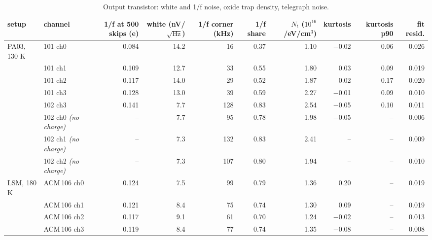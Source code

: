 \begin{table}[H]\centering\small
\caption{Output transistor: white and 1/f noise, oxide trap density, telegraph noise.}\label{tab:tr}
\begin{adjustbox}{max width=\linewidth}
\begin{tabular}{llrrrrrrrr}\toprule
setup & channel & 1/f at 500 skips (e) & white (nV/$\sqrt{\text{Hz}}$) & 1/f corner (kHz) & 1/f share & $N_t$ ($10^{16}$/eV/cm$^3$) & kurtosis & kurtosis p90 & fit resid.\\\midrule
PA03, 130 K & 101 ch0 & \cellcolor{good}0.084 & 14.2 & 16 & 0.37 & \cellcolor{good}1.10 & \cellcolor{good}$-$0.02 & \cellcolor{good}0.06 & \cellcolor{good}0.026\\
 & 101 ch1 & \cellcolor{fair}0.109 & 12.7 & 33 & 0.55 & \cellcolor{good}1.80 & \cellcolor{good}0.03 & \cellcolor{good}0.09 & \cellcolor{good}0.019\\
 & 101 ch2 & \cellcolor{fair}0.117 & 14.0 & 29 & 0.52 & \cellcolor{good}1.87 & \cellcolor{good}0.02 & \cellcolor{fair}0.17 & \cellcolor{good}0.020\\
 & 101 ch3 & \cellcolor{fair}0.128 & 13.0 & 39 & 0.59 & \cellcolor{good}2.27 & \cellcolor{good}$-$0.01 & \cellcolor{good}0.09 & \cellcolor{good}0.010\\
 & 102 ch3 & \cellcolor{fair}0.141 & 7.7 & 128 & 0.83 & \cellcolor{good}2.54 & \cellcolor{good}$-$0.05 & \cellcolor{good}0.10 & \cellcolor{good}0.011\\
 & 102 ch0 \textit{(no charge)} & -- & 7.7 & 95 & 0.78 & \cellcolor{good}1.98 & \cellcolor{good}$-$0.05 & -- & \cellcolor{good}0.006\\
 & 102 ch1 \textit{(no charge)} & -- & 7.3 & 132 & 0.83 & \cellcolor{good}2.41 & -- & -- & \cellcolor{good}0.009\\
 & 102 ch2 \textit{(no charge)} & -- & 7.3 & 107 & 0.80 & \cellcolor{good}1.94 & -- & -- & \cellcolor{good}0.010\\
\midrule
LSM, 180 K & ACM\,106 ch0 & \cellcolor{fair}0.124 & 7.5 & 99 & 0.79 & \cellcolor{good}1.36 & \cellcolor{good}0.20 & -- & \cellcolor{good}0.019\\
 & ACM\,106 ch1 & \cellcolor{fair}0.121 & 8.4 & 75 & 0.74 & \cellcolor{good}1.30 & \cellcolor{good}0.09 & -- & \cellcolor{good}0.019\\
 & ACM\,106 ch2 & \cellcolor{fair}0.117 & 9.1 & 61 & 0.70 & \cellcolor{good}1.24 & \cellcolor{good}$-$0.02 & -- & \cellcolor{good}0.013\\
 & ACM\,106 ch3 & \cellcolor{fair}0.119 & 8.4 & 77 & 0.74 & \cellcolor{good}1.35 & \cellcolor{good}$-$0.08 & -- & \cellcolor{good}0.008\\

\end{tabular}
\end{adjustbox}
\end{table}

